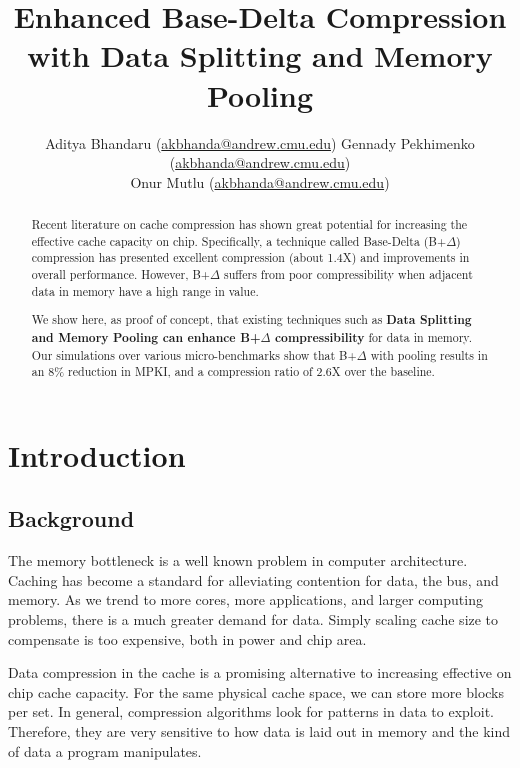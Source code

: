 \documentclass[pageno]{jpaper}
\begin{document}
\title{Enhanced Base-Delta Compression with Data Splitting and Memory Pooling}
\author{Aditya Bhandaru (\href{mailto:akbhanda@andrew.cmu.edu}{akbhanda@andrew.cmu.edu}) Gennady Pekhimenko (\href{mailto:gpekhime@cs.cmu.edu}{akbhanda@andrew.cmu.edu}) \\
Onur Mutlu (\href{mailto:onur@cmu.edu}{akbhanda@andrew.cmu.edu})}
\date{}
\maketitle

\thispagestyle{empty}

\begin{abstract}
Recent literature on cache compression has shown great potential for increasing the effective cache capacity on chip. Specifically, a technique called Base-Delta (B+$\Delta$) compression has presented excellent compression (about 1.4X) and improvements in overall performance. However, B+$\Delta$ suffers from poor compressibility when adjacent data in memory have a high range in value.

We show here, as proof of concept, that existing techniques such as \textbf{Data Splitting and Memory Pooling can enhance B+$\Delta$ compressibility} for data in memory. Our simulations over various micro-benchmarks show that B+$\Delta$ with pooling  results in an 8\% reduction in MPKI, and a compression ratio of 2.6X over the baseline.
\end{abstract}

\section{Introduction}

\subsection{Background}

The memory bottleneck is a well known problem in computer architecture. Caching has become a standard for alleviating contention for data, the bus, and memory. As we trend to more cores, more applications, and larger computing problems, there is a much greater demand for data. Simply scaling cache size to compensate is too expensive, both in power and chip area.

Data compression in the cache is a promising alternative to increasing effective on chip cache capacity. For the same physical cache space, we can store more blocks per set. In general, compression algorithms look for patterns in data to exploit. Therefore, they are very sensitive to how data is laid out in memory and the kind of data a program manipulates.
\end{document}
